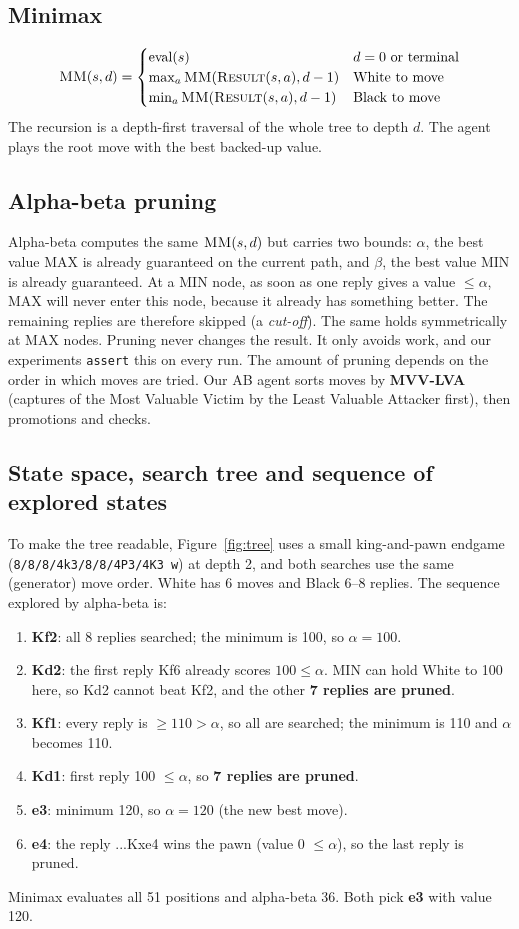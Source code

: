 \documentclass[11pt,a4paper]{article}
\begin{document}
\subsection{Minimax}
\[
\textsc{MM}(s,d)=\begin{cases}
\mathrm{eval}(s) & d=0 \text{ or terminal}\\
\max_a \textsc{MM}(\textsc{Result}(s,a),d-1) & \text{White to move}\\
\min_a \textsc{MM}(\textsc{Result}(s,a),d-1) & \text{Black to move}
\end{cases}
\]
The recursion is a depth-first traversal of the whole tree to depth $d$. The agent plays the root move with the best
backed-up value.

\subsection{Alpha-beta pruning}
Alpha-beta computes the same $\textsc{MM}(s,d)$ but carries two bounds: $\alpha$, the best value MAX is already
guaranteed on the current path, and $\beta$, the best value MIN is already guaranteed. At a MIN node, as soon
as one reply gives a value $\le\alpha$, MAX will never enter this node, because it already has something better. The
remaining replies are therefore skipped (a \emph{cut-off}). The same holds symmetrically at MAX nodes.
Pruning never changes the result. It only avoids work, and our experiments \texttt{assert} this on every run.
The amount of pruning depends on the order in which moves are tried. Our AB agent sorts moves by
\textbf{MVV-LVA} (captures of the Most Valuable Victim by the Least Valuable Attacker first), then promotions and checks.

\subsection{State space, search tree and sequence of explored states}
To make the tree readable, Figure~\ref{fig:tree} uses a small king-and-pawn endgame
(\texttt{8/8/8/4k3/8/8/4P3/4K3 w}) at depth 2, and both searches use the same (generator) move order.
White has 6 moves and Black 6--8 replies. The sequence explored by alpha-beta is:
\begin{enumerate}
\item \textbf{Kf2}: all 8 replies searched; the minimum is 100, so $\alpha=100$.
\item \textbf{Kd2}: the first reply Kf6 already scores $100\le\alpha$. MIN can hold White to 100 here, so Kd2
cannot beat Kf2, and the other \textbf{7 replies are pruned}.
\item \textbf{Kf1}: every reply is $\ge110>\alpha$, so all are searched; the minimum is 110 and $\alpha$ becomes 110.
\item \textbf{Kd1}: first reply 100 $\le\alpha$, so \textbf{7 replies are pruned}.
\item \textbf{e3}: minimum 120, so $\alpha=120$ (the new best move).
\item \textbf{e4}: the reply ...Kxe4 wins the pawn (value 0 $\le\alpha$), so the last reply is pruned.
\end{enumerate}
Minimax evaluates all 51 positions and alpha-beta 36. Both pick \textbf{e3} with value 120.
\end{document}
